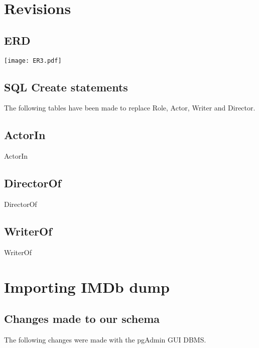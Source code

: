 \section{Revisions}

\subsection{ERD}
\texttt{[image: ER3.pdf]}

\subsection{SQL Create statements}
The following tables have been made to replace Role, Actor, Writer and Director.

\subsection*{ActorIn}
\begin{createSQL}{ActorIn}
\end{createSQL}

\subsection*{DirectorOf}
\begin{createSQL}{DirectorOf}
\end{createSQL}

\subsection*{WriterOf}
\begin{createSQL}{WriterOf}
\end{createSQL}

\section{Importing IMDb dump}

\subsection{Changes made to our schema}
The following changes were made with the pgAdmin GUI DBMS.

